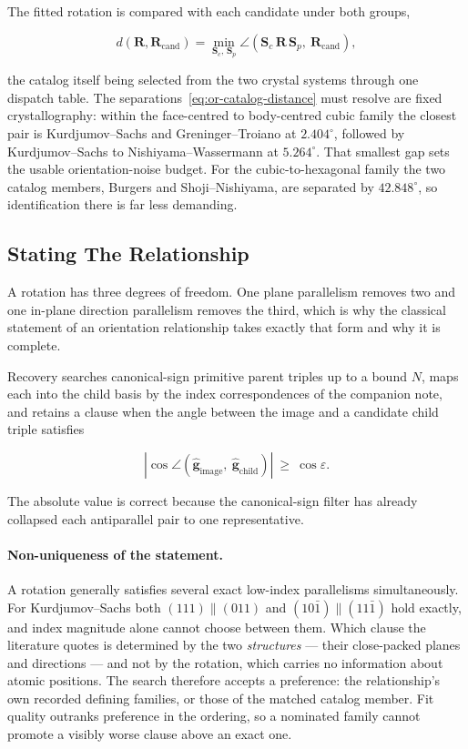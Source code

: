 The fitted rotation is compared with each candidate under both groups,

\begin{equation}
d\!\left(\mathbf{R}, \mathbf{R}_{\mathrm{cand}}\right)
= \min_{\mathbf{S}_{c},\,\mathbf{S}_{p}}
\angle\!\left( \mathbf{S}_{c}\,\mathbf{R}\,\mathbf{S}_{p},\ \mathbf{R}_{\mathrm{cand}} \right),
\label{eq:or-catalog-distance}
\end{equation}

the catalog itself being selected from the two crystal systems through one dispatch table. The
separations~\eqref{eq:or-catalog-distance} must resolve are fixed crystallography: within the
face-centred to body-centred cubic family the closest pair is Kurdjumov--Sachs and
Greninger--Troiano at $2.404^{\circ}$, followed by Kurdjumov--Sachs to Nishiyama--Wassermann at
$5.264^{\circ}$. That smallest gap sets the usable orientation-noise budget. For the
cubic-to-hexagonal family the two catalog members, Burgers and Shoji--Nishiyama, are separated by
$42.848^{\circ}$, so identification there is far less demanding.

\subsection{Stating The Relationship}

A rotation has three degrees of freedom. One plane parallelism removes two and one in-plane
direction parallelism removes the third, which is why the classical statement of an orientation
relationship takes exactly that form and why it is complete.

Recovery searches canonical-sign primitive parent triples up to a bound $N$, maps each into the
child basis by the index correspondences of the companion note, and retains a clause when the
angle between the image and a candidate child triple satisfies

\begin{equation}
\left| \cos \angle\!\left(
\hat{\mathbf{g}}_{\mathrm{image}},\ \hat{\mathbf{g}}_{\mathrm{child}} \right) \right|
\ \ge\ \cos \varepsilon .
\end{equation}

The absolute value is correct because the canonical-sign filter has already collapsed each
antiparallel pair to one representative.

\paragraph{Non-uniqueness of the statement.} A rotation generally satisfies several exact
low-index parallelisms simultaneously. For Kurdjumov--Sachs both $(111)\parallel(011)$ and
$(10\bar{1})\parallel(11\bar{1})$ hold exactly, and index magnitude alone cannot choose between
them. Which clause the literature quotes is determined by the two \emph{structures} --- their
close-packed planes and directions --- and not by the rotation, which carries no information about
atomic positions. The search therefore accepts a preference: the relationship's own recorded
defining families, or those of the matched catalog member. Fit quality outranks preference in the
ordering, so a nominated family cannot promote a visibly worse clause above an exact one.

